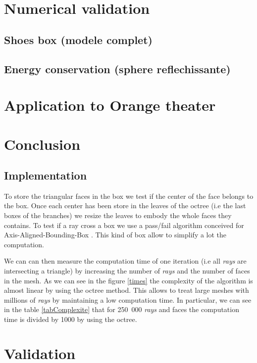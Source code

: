 \documentclass[AMA,STIX1COL]{WileyNJD-v2}
\begin{document}
\section{Numerical validation}
\subsection{Shoes box (modele complet)}
\subsection{Energy conservation (sphere reflechissante)}

\section{Application to Orange theater}

\section{Conclusion}

\subsection{Implementation}


To store the triangular faces in the box we test if the center of the face belongs to the box. Once each center has been store in the leaves of the octree (i.e the last boxes of the branches) we resize the leaves to embody the whole faces they contains. To test if a ray cross a box we use a pass/fail algorithm conceived for Axis-Aligned-Bounding-Box \cite{AABB}. This kind of box allow to simplify a lot the computation. 


We can can then measure the computation time of one iteration (i.e all \textit{rays} are intersecting a triangle) by increasing the number of \textit{rays} and the number of faces in the mesh. As we can see in the figure \ref{times} the complexity of the algorithm is almost linear by using the octree method. This allows to treat large meshes with millions of \textit{rays} by maintaining a low computation time. In particular, we can see in the table \ref{tabComplexite} that for 250~000 \textit{rays} and faces the computation time is divided by 1000 by using the octree. 


\newpage

\section{Validation}\label{sec5}
\end{document}
